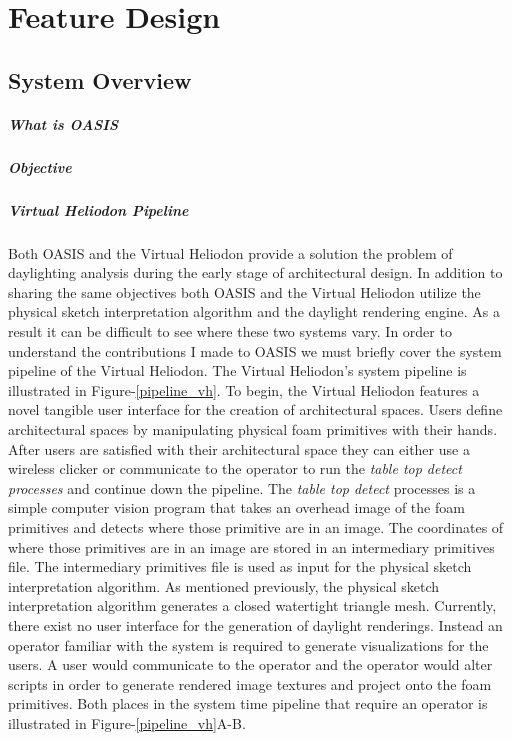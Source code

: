 \chapter{Feature Design} \label{sec:feature}

	\section{System Overview}

		\paragraph{What is OASIS}

		\paragraph{Objective}

		\paragraph{Virtual Heliodon Pipeline}

			Both OASIS and the Virtual Heliodon provide a solution the problem of daylighting analysis during the early stage of architectural design.
			In addition to sharing the same objectives both OASIS and the Virtual Heliodon utilize the physical sketch interpretation algorithm and the daylight rendering engine.
			As a result it can be difficult to see where these two systems vary.
			In order to understand the contributions I made to OASIS we must briefly cover the system pipeline of the Virtual Heliodon.
			The Virtual Heliodon's system pipeline is illustrated in Figure-\ref{pipeline_vh}.
			To begin, the Virtual Heliodon features a novel tangible user interface for the creation of architectural spaces.
			Users define architectural spaces by manipulating physical foam primitives with their hands.
			After users are satisfied with their architectural space they can either use a wireless clicker or communicate to the operator to run the \textit{table top detect processes} and continue down the pipeline.
			The \textit{table top detect} processes is a simple computer vision program that takes an overhead image of the foam primitives and detects where those primitive are in an image.
			The coordinates of where those primitives are in an image are stored in an intermediary primitives file. The intermediary primitives file is used as input for the physical sketch interpretation algorithm. As mentioned previously, the physical sketch interpretation algorithm generates a closed watertight triangle mesh.
			Currently, there exist no user interface for the generation of daylight renderings.
			Instead an operator familiar with the system is required to generate visualizations for the users. A user would communicate to the operator and the operator would alter scripts in order to generate rendered image textures and project onto the foam primitives. Both places in the system time pipeline that require an operator is illustrated in Figure-\ref{pipeline_vh}A-B.

